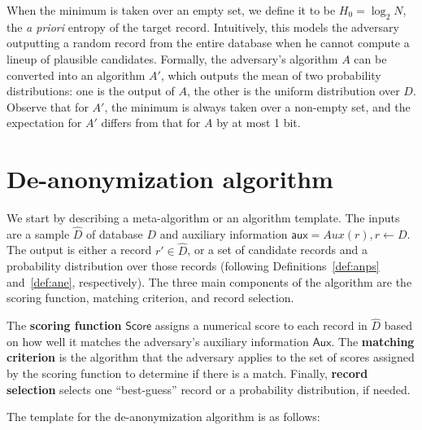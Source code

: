 \documentclass[11pt]{article}
\newcommand{\Aux}{\textsf{Aux}}
\newcommand{\aux}{\textsf{aux}}
\newcommand{\score}{\textsf{Score}}
\begin{document}
When the minimum is taken over an empty set, we define it to be $H_0 =
\log_2 N$, the \emph{a priori} entropy of the target record.  Intuitively,
this models the adversary outputting a random record from the entire
database when he cannot compute a lineup of plausible candidates.
Formally, the adversary's algorithm $A$ can be converted into an
algorithm $A'$, which outputs the mean of two probability distributions:
one is the output of $A$, the other is the uniform distribution over $D$.
Observe that for $A'$, the minimum is always taken over a non-empty set,
and the expectation for $A'$ differs from that for $A$ by at most 1 bit.



\section{De-anonymization algorithm}
\label{meta-alg}

We start by describing a meta-algorithm or an algorithm template.
The inputs are a sample ${\hat D}$ of database $D$ and auxiliary
information $\aux = Aux(r), r \leftarrow D$.  The output is either a
record $r' \in {\hat D}$, or a set of candidate records and a probability
distribution over those records (following Definitions~\ref{def:anps}
and~\ref{def:ane}, respectively).  The three main components of the
algorithm are the scoring function, matching criterion, and record
selection.

The \textbf{scoring function} $\score$ assigns a numerical score to
each record in ${\hat D}$ based on how well it matches the adversary's
auxiliary information $\Aux$.  The \textbf{matching criterion} is the
algorithm that the adversary applies to the set of scores assigned
by the scoring function to determine if there is a match.  Finally,
\textbf{record selection} selects one ``best-guess'' record or
a probability distribution, if needed.

The template for the de-anonymization algorithm is as follows: 
\end{document}
